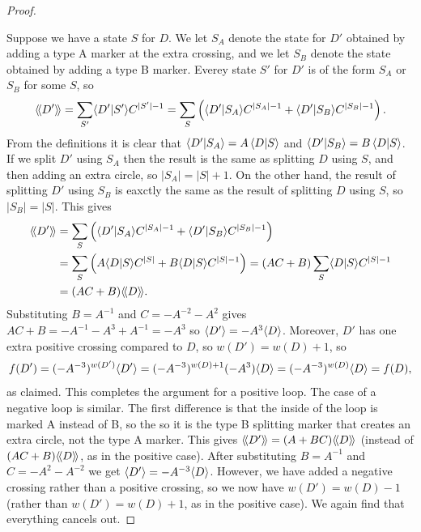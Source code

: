 \documentclass[reqno]{amsart}
\theoremstyle{definition}
\begin{document}
\begin{proof}
\begin{center}
 \end{center} 
 Suppose we have a state $S$ for $D$.  We let $S_A$ denote the state
 for $D'$ obtained by adding a type A marker at the extra crossing,
 and we let $S_B$ denote the state obtained by adding a type B
 marker.  Everey state $S'$ for $D'$ is of the form $S_A$ or $S_B$ for
 some $S$, so
 \[ \langle\!\langle D'\rangle\!\rangle = \sum_{S'} \langle D'|S'\rangle C^{|S'|-1} =
      \sum_S \left(\langle D'|S_A\rangle C^{|S_A|-1} + \langle D'|S_B\rangle C^{|S_B|-1}\right).
 \]
 From the definitions it is clear that $\langle D'|S_A\rangle=A\,\langle D|S\rangle$ and
 $\langle D'|S_B\rangle=B\,\langle D|S\rangle$.  If we split $D'$ using $S_A$ then the
 result is the same as splitting $D$ using $S$, and then adding an
 extra circle, so $|S_A|=|S|+1$.  On the other hand, the result of
 splitting $D'$ using $S_B$ is eaxctly the same as the result of
 splitting $D$ using $S$, so $|S_B|=|S|$.  This gives 
 \begin{align*}
  \langle\!\langle D'\rangle\!\rangle &=
   \sum_S \left(\langle D'|S_A\rangle C^{|S_A|-1} + \langle D'|S_B\rangle C^{|S_B|-1}\right) \\
   &= \sum_S\left(A\langle D|S\rangle C^{|S|} + B\langle D|S\rangle C^{|S|-1} \right)
    = (AC+B) \sum_S\langle D|S\rangle C^{|S|-1} \\
   &= (AC+B)\langle\!\langle D\rangle\!\rangle.
 \end{align*}
 Substituting $B=A^{-1}$ and $C=-A^{-2}-A^2$ gives
 $AC+B=-A^{-1}-A^3+A^{-1}=-A^3$ so $\langle D'\rangle=-A^3\langle D\rangle$.  Moreover,
 $D'$ has one extra positive crossing compared to $D$, so
 $w(D')=w(D)+1$, so 
 \[ f(D') = (-A^{-3})^{w(D')} \langle D'\rangle = 
     (-A^{-3})^{w(D)+1} (-A^3) \langle D\rangle = 
     (-A^{-3})^{w(D)} \langle D\rangle = f(D),
 \]
 as claimed.  This completes the argument for a positive loop.  The
 case of a negative loop is similar.  The first difference is that the
 inside of the loop is marked A instead of B, so the so it is the type
 B splitting marker that creates an extra circle, not the type A
 marker.  This gives $\langle\!\langle D'\rangle\!\rangle=(A+BC)\langle\!\langle D\rangle\!\rangle$ (instead of
 $(AC+B)\langle\!\langle D\rangle\!\rangle$, as in the positive case).  After substituting
 $B=A^{-1}$ and $C=-A^2-A^{-2}$ we get $\langle D'\rangle=-A^{-3}\langle D\rangle$.
 However, we have added a negative crossing rather than a positive
 crossing, so we now have $w(D')=w(D)-1$ (rather than $w(D')=w(D)+1$,
 as in the positive case).  We again find that everything cancels out.
\end{proof}
\end{document}

